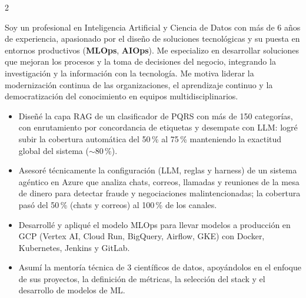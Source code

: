 \documentclass[10pt,a4paper,ragged2e,withhyper]{altacv}
\begin{document}
\begin{paracol}{2}


Soy un profesional en Inteligencia Artificial y Ciencia de Datos con más de 6 años de experiencia, apasionado por el diseño de soluciones tecnológicas y su puesta en entornos productivos (\textbf{MLOps}, \textbf{AIOps}). Me especializo en desarrollar soluciones que mejoran los procesos y la toma de decisiones del negocio, integrando la investigación y la información con la tecnología. Me motiva liderar la modernización continua de las organizaciones, el aprendizaje continuo y la democratización del conocimiento en equipos multidisciplinarios.



\begin{itemize}
\item Diseñé la capa RAG de un clasificador de PQRS con más de 150 categorías, con enrutamiento por concordancia de etiquetas y desempate con LLM: logré subir la cobertura automática del 50\,\% al 75\,\% manteniendo la exactitud global del sistema (${\sim}$80\,\%).
\item Asesoré técnicamente la configuración (LLM, reglas y harness) de un sistema agéntico en Azure que analiza chats, correos, llamadas y reuniones de la mesa de dinero para detectar fraude y negociaciones malintencionadas; la cobertura pasó del 50\,\% (chats y correos) al 100\,\% de los canales.
\item Desarrollé y apliqué el modelo MLOps para llevar modelos a producción en GCP (Vertex AI, Cloud Run, BigQuery, Airflow, GKE) con Docker, Kubernetes, Jenkins y GitLab.
\item Asumí la mentoría técnica de 3 científicos de datos, apoyándolos en el enfoque de sus proyectos, la definición de métricas, la selección del stack y el desarrollo de modelos de ML.
\end{itemize}

\divider



\end{paracol}
\end{document}
